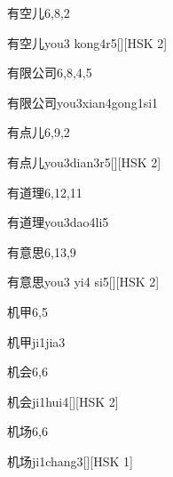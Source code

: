 \begin{entry}{有空儿}{6,8,2}
  \begin{phonetics}{有空儿}{you3 kong4r5}[][HSK 2]
  \end{phonetics}
\end{entry}

\begin{entry}{有限公司}{6,8,4,5}
  \begin{phonetics}{有限公司}{you3xian4gong1si1}
  \end{phonetics}
\end{entry}

\begin{entry}{有点儿}{6,9,2}
  \begin{phonetics}{有点儿}{you3dian3r5}[][HSK 2]
  \end{phonetics}
\end{entry}

\begin{entry}{有道理}{6,12,11}
  \begin{phonetics}{有道理}{you3dao4li5}
  \end{phonetics}
\end{entry}

\begin{entry}{有意思}{6,13,9}
  \begin{phonetics}{有意思}{you3 yi4 si5}[][HSK 2]
  \end{phonetics}
\end{entry}

\begin{entry}{机甲}{6,5}
  \begin{phonetics}{机甲}{ji1jia3}
  \end{phonetics}
\end{entry}

\begin{entry}{机会}{6,6}
  \begin{phonetics}{机会}{ji1hui4}[][HSK 2]
  \end{phonetics}
\end{entry}

\begin{entry}{机场}{6,6}
  \begin{phonetics}{机场}{ji1chang3}[][HSK 1]
  \end{phonetics}
\end{entry}

